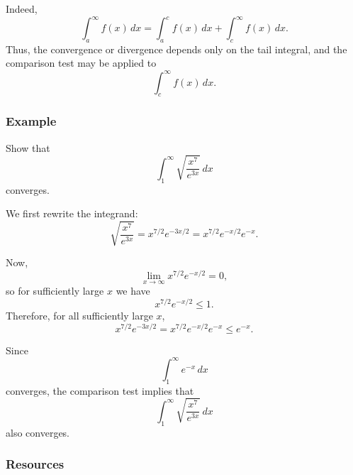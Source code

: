 Indeed,
\[
\int_a^\infty f(x)\,dx
=
\int_a^c f(x)\,dx
+
\int_c^\infty f(x)\,dx.
\]
Thus, the convergence or divergence depends only on the tail integral, and the comparison test may be applied to
\[
\int_c^\infty f(x)\,dx.
\]

\subsubsection{Example}
\label{sss:exam-1a79}

Show that
\[
\int_1^\infty \sqrt{\frac{x^7}{e^{3x}}}\,dx
\]
converges.

We first rewrite the integrand:
\[
\sqrt{\frac{x^7}{e^{3x}}}
=
x^{7/2}e^{-3x/2}
=
x^{7/2}e^{-x/2}e^{-x}.
\]

Now,
\[
\lim_{x\to\infty} x^{7/2}e^{-x/2}=0,
\]
so for sufficiently large $x$ we have
\[
x^{7/2}e^{-x/2}\le 1.
\]
Therefore, for all sufficiently large $x$,
\[
x^{7/2}e^{-3x/2}
=
x^{7/2}e^{-x/2}e^{-x}
\le e^{-x}.
\]

Since
\[
\int_1^\infty e^{-x}\,dx
\]
converges, the comparison test implies that
\[
\int_1^\infty \sqrt{\frac{x^7}{e^{3x}}}\,dx
\]
also converges.


\subsubsection{Resources}
\label{sss:reso-55b5}

